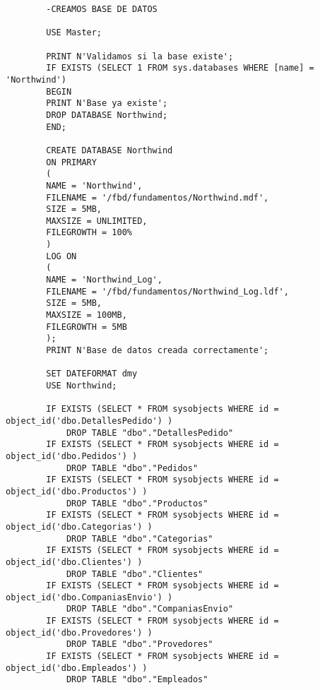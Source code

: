 \documentclass[12pt, letterpaper]{article}
\begin{document}
    {\scriptsize
    \begin{lstlisting}    
        -CREAMOS BASE DE DATOS

        USE Master;
        
        PRINT N'Validamos si la base existe';
        IF EXISTS (SELECT 1 FROM sys.databases WHERE [name] = 'Northwind')
        BEGIN
        PRINT N'Base ya existe';
        DROP DATABASE Northwind;
        END;
        
        CREATE DATABASE Northwind
        ON PRIMARY
        (
        NAME = 'Northwind',
        FILENAME = '/fbd/fundamentos/Northwind.mdf',
        SIZE = 5MB,
        MAXSIZE = UNLIMITED,
        FILEGROWTH = 100%
        )
        LOG ON
        (
        NAME = 'Northwind_Log',
        FILENAME = '/fbd/fundamentos/Northwind_Log.ldf',
        SIZE = 5MB,
        MAXSIZE = 100MB,
        FILEGROWTH = 5MB
        );
        PRINT N'Base de datos creada correctamente';

        SET DATEFORMAT dmy
        USE Northwind;
        
        IF EXISTS (SELECT * FROM sysobjects WHERE id = object_id('dbo.DetallesPedido') )
            DROP TABLE "dbo"."DetallesPedido"
        IF EXISTS (SELECT * FROM sysobjects WHERE id = object_id('dbo.Pedidos') )
            DROP TABLE "dbo"."Pedidos"
        IF EXISTS (SELECT * FROM sysobjects WHERE id = object_id('dbo.Productos') )
            DROP TABLE "dbo"."Productos"
        IF EXISTS (SELECT * FROM sysobjects WHERE id = object_id('dbo.Categorias') )
            DROP TABLE "dbo"."Categorias"
        IF EXISTS (SELECT * FROM sysobjects WHERE id = object_id('dbo.Clientes') )
            DROP TABLE "dbo"."Clientes"
        IF EXISTS (SELECT * FROM sysobjects WHERE id = object_id('dbo.CompaniasEnvio') )
            DROP TABLE "dbo"."CompaniasEnvio"
        IF EXISTS (SELECT * FROM sysobjects WHERE id = object_id('dbo.Provedores') )
            DROP TABLE "dbo"."Provedores"
        IF EXISTS (SELECT * FROM sysobjects WHERE id = object_id('dbo.Empleados') )
            DROP TABLE "dbo"."Empleados"


\end{lstlisting}}
\end{document}
